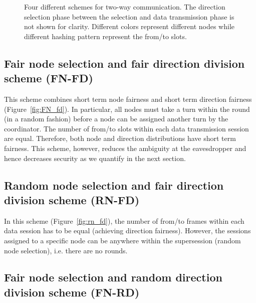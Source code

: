 \documentclass[10pt,letterpaper,conference]{IEEEtran}
\begin{document}
\begin{figure*}[!t]
\centering
{}
\caption{Four different schemes for two-way communication. The direction selection phase between the selection and data transmission phase is not shown for clarity. Different colors represent different nodes while different hashing pattern represent the from/to slots.}
\label{fig:extensions}
\end{figure*}

\subsection{Fair node selection and fair direction division scheme (FN-FD)}
This scheme combines short term node fairness and short term
direction fairness (Figure~\ref{fig:FN_fd}). In particular, all nodes must take a turn within the round (in a random fashion) before a node can be assigned another turn by the coordinator. The number of from/to slots within each data transmission session are equal. Therefore, both node and direction distributions have short
term fairness. This scheme, however, reduces the
ambiguity at the eavesdropper and hence decreases security as we quantify in the next section.

\subsection{Random node selection and fair direction division scheme (RN-FD)}

In this scheme (Figure~\ref{fig:rn_fd}), the number of from/to frames within each data session has to be equal (achieving direction fairness). However, the sessions assigned to a specific node can be anywhere within the supersession (random node selection), i.e. there are no rounds.

\subsection{Fair node selection and random direction division scheme (FN-RD)}
\end{document}

